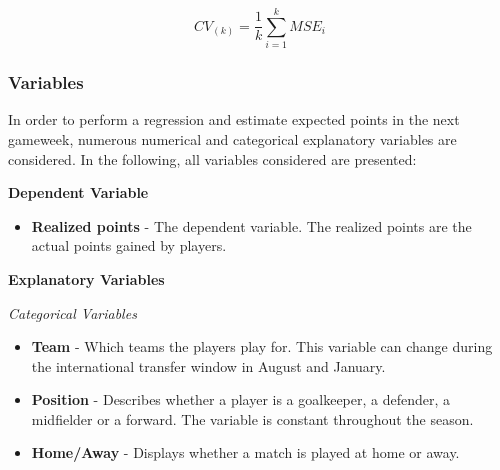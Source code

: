 \begin{equation}\label{eq:cv}
    CV_{(k)} = \frac{1}{k}\sum_{i=1}^{k} MSE_i
\end{equation}

\subsubsection{Variables}
In order to perform a regression and estimate expected points in the next gameweek, numerous numerical and categorical explanatory variables are considered. In the following, all variables considered are presented: 

\newpar

\textbf{Dependent Variable}
\begin{itemize}
    \item \textbf{Realized points} - The dependent variable. The realized points are the actual points gained by players.
\end{itemize}

\textbf{Explanatory Variables}

\textit{Categorical Variables}
\newpar
\begin{itemize}
    \item \textbf{Team} - Which teams the players play for. This variable can change during the international transfer window in August and January.  
    
    \item \textbf{Position} - Describes whether a player is a goalkeeper, a defender, a midfielder or a forward. The variable is constant throughout the season.
    \item \textbf{Home/Away} - Displays whether a match is played at home or away.
\end{itemize}
\newpar

